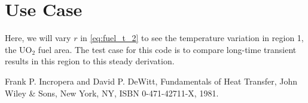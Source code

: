\documentclass[12pt]{article}
\newcommand{\uo}{\mathrm{UO}_2}
\begin{document}
\section{Use Case}

Here, we will vary $r$ in \eqref{eq:fuel_t_2} to see the temperature variation in region 1, the $\uo$ fuel area. 
The test case for this code is to compare long-time transient results in this region to this steady derivation.


\begin{thebibliography}{10}

Frank P. Incropera and David P. DeWitt, Fundamentals of Heat Transfer,
John Wiley \& Sons, New York, NY, ISBN 0-471-42711-X, 1981.

\end{thebibliography}
\end{document}
